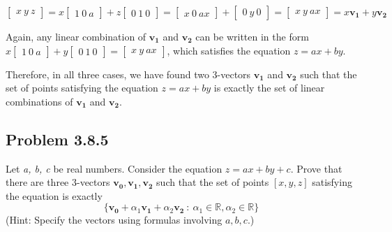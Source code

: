 \documentclass[
  letterpaper,
  DIV=11,
  numbers=noendperiod]{scrartcl}
\begin{document}
\(\begin{bmatrix} x \ y \ z \end{bmatrix} = x\begin{bmatrix} 1 \ 0 \ a \end{bmatrix} + z\begin{bmatrix} 0 \ 1 \ 0 \end{bmatrix} = \begin{bmatrix} x \ 0 \ ax \end{bmatrix} + \begin{bmatrix} 0 \ y \ 0 \end{bmatrix} = \begin{bmatrix} x \ y \ ax \end{bmatrix} = x\mathbf{v_1} + y\mathbf{v_2}\)

Again, any linear combination of \(\mathbf{v_1}\) and \(\mathbf{v_2}\)
can be written in the form
\(x\begin{bmatrix} 1 \ 0 \ a \end{bmatrix} + y\begin{bmatrix} 0 \ 1 \ 0 \end{bmatrix} = \begin{bmatrix} x \ y \ ax \end{bmatrix}\),
which satisfies the equation \(z = ax + by\).

Therefore, in all three cases, we have found two 3-vectors
\(\mathbf{v_1}\) and \(\mathbf{v_2}\) such that the set of points
satisfying the equation \(z = ax + by\) is exactly the set of linear
combinations of \(\mathbf{v_1}\) and \(\mathbf{v_2}\).

\newpage{}

\hypertarget{problem-3.8.5}{%
\subsection{Problem 3.8.5}\label{problem-3.8.5}}

Let \emph{a, b, c} be real numbers. Consider the equation
\(z = ax + by + c\). Prove that there are three 3-vectors
\(\bm{v_0}, \bm{v_1}, \bm{v_2}\) such that the set of points
\([x, y, z]\) satisfying the equation is exactly \begin{equation*}
\{\bm{v_0}+\alpha_1 \bm{v_1} + \alpha_2 \bm{v_2} \ : \ \alpha_1 \in \mathbb{R}, \alpha_2 \in \mathbb{R} \}
\end{equation*} (Hint: Specify the vectors using formulas involving
\(a, b, c\).)
\end{document}
